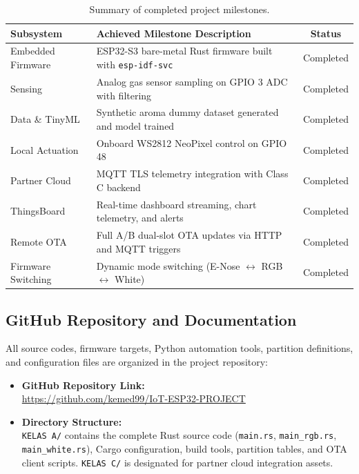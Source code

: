 ﻿\documentclass[12pt,a4paper]{article}
\begin{document}
\begin{table}[H]
\centering
\small
\renewcommand{\arraystretch}{1.3}
\begin{tabularx}{\textwidth}{l p{7.5cm} c}
\toprule
\textbf{Subsystem} & \textbf{Achieved Milestone Description} & \textbf{Status} \\
\midrule
Embedded Firmware & ESP32-S3 bare-metal Rust firmware built with \texttt{esp-idf-svc} & Completed \\
Sensing & Analog gas sensor sampling on GPIO 3 ADC with filtering & Completed \\
Data \& TinyML & Synthetic aroma dummy dataset generated and model trained & Completed \\
Local Actuation & Onboard WS2812 NeoPixel control on GPIO 48 & Completed \\
Partner Cloud & MQTT TLS telemetry integration with Class C backend & Completed \\
ThingsBoard & Real-time dashboard streaming, chart telemetry, and alerts & Completed \\
Remote OTA & Full A/B dual-slot OTA updates via HTTP and MQTT triggers & Completed \\
Firmware Switching & Dynamic mode switching (E-Nose $\leftrightarrow$ RGB $\leftrightarrow$ White) & Completed \\
\bottomrule
\end{tabularx}
\caption{Summary of completed project milestones.}
\label{tab:milestones}
\end{table}

\subsection{GitHub Repository and Documentation}
All source codes, firmware targets, Python automation tools, partition definitions, and configuration files are organized in the project repository:
\begin{itemize}
    \item \textbf{GitHub Repository Link:} \\
    \url{https://github.com/kemed99/IoT-ESP32-PROJECT}
    \item \textbf{Directory Structure:} \\
    \texttt{KELAS A/} contains the complete Rust source code (\texttt{main.rs}, \texttt{main\_rgb.rs}, \texttt{main\_white.rs}), Cargo configuration, build tools, partition tables, and OTA client scripts. \texttt{KELAS C/} is designated for partner cloud integration assets.
\end{itemize}
\end{document}
